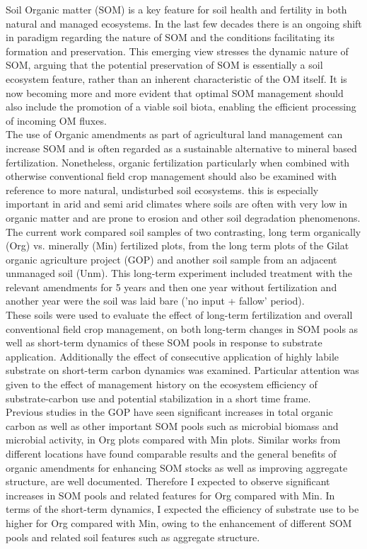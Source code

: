 	Soil Organic matter (SOM) is a key feature for soil health and fertility in both natural and managed ecosystems. In the last few decades there is an ongoing shift in paradigm regarding the nature of SOM and the conditions facilitating its formation and preservation. This emerging view stresses the dynamic nature of SOM, arguing that the potential preservation of SOM is essentially a soil ecosystem feature, rather than an inherent characteristic of the OM itself. It is now becoming more and more evident that optimal SOM management should also include the promotion of a viable soil biota, enabling the efficient processing of incoming OM fluxes.  \\
	The use of Organic amendments as part of agricultural land management can increase SOM and is often regarded as a sustainable alternative to mineral based fertilization. Nonetheless, organic fertilization particularly when combined with otherwise conventional field crop management should also be examined with reference to more natural, undisturbed soil ecosystems. this is especially important in arid and semi arid climates where soils are often with very low in organic matter and are prone to erosion and other soil degradation phenomenons.\\
	The current work compared soil samples of two contrasting, long term organically (Org) vs. minerally (Min) fertilized plots, from the long term plots of the Gilat organic agriculture project (GOP) and another soil sample from an adjacent unmanaged soil (Unm). This long-term experiment included treatment with the relevant amendments for 5 years and then one year without fertilization and another year were the soil was laid bare ('no input + fallow' period).\\
	These soils were used to evaluate the effect of long-term fertilization and overall conventional field crop management, on both long-term changes in SOM pools as well as short-term dynamics of these SOM pools in response to substrate application. Additionally the effect of consecutive application of highly labile substrate on short-term carbon dynamics was examined. Particular attention was given to the effect of management history on the ecosystem efficiency of substrate-carbon use and potential stabilization in a short time frame.\\
	Previous studies in the GOP have seen significant increases in total organic carbon as well as other important SOM pools such as microbial biomass and microbial activity, in Org plots compared with Min plots. Similar works from different locations have found comparable results and the general benefits of organic amendments for enhancing SOM stocks as well as improving aggregate  structure, are well documented. Therefore I expected to observe significant increases in SOM pools and related features for Org compared with Min. In terms of the short-term dynamics, I expected the efficiency of substrate use to be higher for Org compared with Min, owing to the enhancement of different SOM pools and related soil features such as aggregate structure. 
